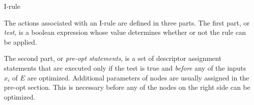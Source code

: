 \begin{centeredfigure}
\def\subfigtopskip{0pt}
\caption{I-rule}
\label{fig:irules}
\end{centeredfigure}

The actions associated with an I-rule are defined in three parts.  
The first part, or \emph{test}, is a boolean expression whose
value determines whether or not the rule can be applied.

The second part, or \emph{pre-opt statements}, is a set of descriptor
assignment statements that are executed only if the test is true and
\emph{before} any of the inputs $x_i$ of $E$ are optimized.  Additional
parameters of nodes are usually assigned in the pre-opt section.  This
is necessary before any of the nodes on the right side can be
optimized.

